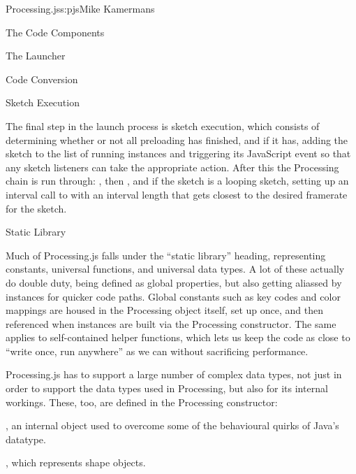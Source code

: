 \begin{aosachapter}{Processing.js}{s:pjs}{Mike Kamermans}
\begin{aosasect1}{The Code Components}
\begin{aosasect2}{The Launcher}
\begin{aosasect3}{Code Conversion}
\end{aosasect3}

\begin{aosasect3}{Sketch Execution}

The final step in the launch process is sketch execution, which
consists of determining whether or not all preloading has finished,
and if it has, adding the sketch to the list of running instances
and triggering its JavaScript  event so that any sketch
listeners can take the appropriate action. After this the Processing
chain is run through: , then , and if the
sketch is a looping sketch, setting up an interval call to 
with an interval length that gets closest to the desired framerate for
the sketch.

\end{aosasect3}

\end{aosasect2}

\begin{aosasect2}{Static Library}

Much of Processing.js falls under the ``static library'' heading,
representing constants, universal functions, and universal data
types. A lot of these actually do double duty, being defined as global
properties, but also getting aliassed by instances for quicker code
paths. Global constants such as key codes and color mappings are
housed in the Processing object itself, set up once, and then
referenced when instances are built via the Processing
constructor. The same applies to self-contained helper functions,
which lets us keep the code as close to ``write once, run anywhere'' as
we can without sacrificing performance.

Processing.js has to support a large number of complex data types, not
just in order to support the data types used in Processing, but also
for its internal workings. These, too, are defined in the Processing
constructor:

\begin{aosaitemize}


\item {}, an internal object used to overcome some of the
  behavioural quirks of Java's  datatype.

\item {}, which represents shape objects.


\end{aosaitemize}
\end{aosasect2}
\end{aosasect1}
\end{aosachapter}
